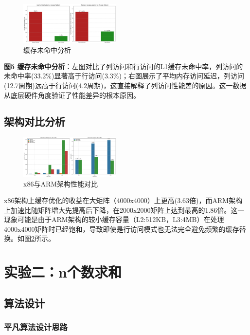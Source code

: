 \documentclass[a4paper,colorlinks=true,linkcolor=blue,urlcolor=blue,citecolor=green,bookmarks=true]{article}
\begin{document}
\begin{figure}[htbp]
  \centering
  \includegraphics[width=0.45\textwidth]{cache_miss_analysis.png}
  \caption{缓存未命中分析}
  \label{fig:cache_miss}
\end{figure}

\textbf{图5 缓存未命中分析}：左图对比了列访问和行访问的L1缓存未命中率，列访问的未命中率(33.2\%)显著高于行访问(3.3\%)；右图展示了平均内存访问延迟，列访问(12.7周期)远高于行访问(4.2周期)，这直接解释了列访问性能差的原因。这一数据从底层硬件角度验证了性能差异的根本原因。

\subsection{架构对比分析}

\begin{figure}[htbp]
  \centering
  \includegraphics[width=0.45\textwidth]{matrix_arch_comparison.png}
  \caption{x86与ARM架构性能对比}
  \label{fig:arch_comparison}
\end{figure}

x86架构上缓存优化的收益在大矩阵（4000x4000）上更高(3.63倍)，而ARM架构上加速比随矩阵增大先提高后下降，在2000x2000矩阵上达到最高的1.86倍。这一现象可能是由于ARM架构的较小缓存容量（L2:512KB，L3:4MB）在处理4000x4000矩阵时已经饱和，导致即使是行访问模式也无法完全避免频繁的缓存替换。如图\ref{fig:arch_comparison}所示。

\section{实验二：n个数求和}

\subsection{算法设计}

\subsubsection{平凡算法设计思路}
\end{document}
